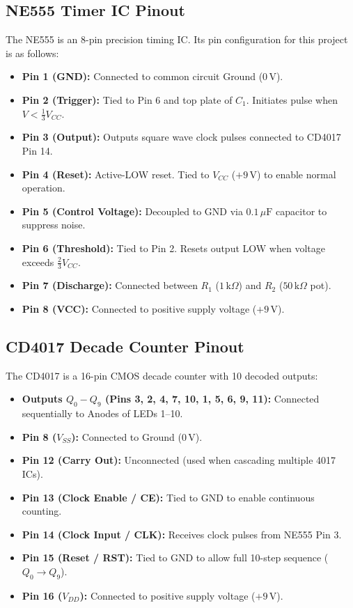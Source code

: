 \documentclass[11pt,a4paper]{article}
\begin{document}
\subsection{NE555 Timer IC Pinout}
The NE555 is an 8-pin precision timing IC. Its pin configuration for this project is as follows:
\begin{itemize}[noitemsep]
    \item \textbf{Pin 1 (GND):} Connected to common circuit Ground ($0\,\text{V}$).
    \item \textbf{Pin 2 (Trigger):} Tied to Pin 6 and top plate of $C_1$. Initiates pulse when $V < \frac{1}{3}V_{CC}$.
    \item \textbf{Pin 3 (Output):} Outputs square wave clock pulses connected to CD4017 Pin 14.
    \item \textbf{Pin 4 (Reset):} Active-LOW reset. Tied to $V_{CC}$ ($+9\,\text{V}$) to enable normal operation.
    \item \textbf{Pin 5 (Control Voltage):} Decoupled to GND via $0.1\,\mu\text{F}$ capacitor to suppress noise.
    \item \textbf{Pin 6 (Threshold):} Tied to Pin 2. Resets output LOW when voltage exceeds $\frac{2}{3}V_{CC}$.
    \item \textbf{Pin 7 (Discharge):} Connected between $R_1$ ($1\,\text{k}\Omega$) and $R_2$ ($50\,\text{k}\Omega$ pot).
    \item \textbf{Pin 8 (VCC):} Connected to positive supply voltage ($+9\,\text{V}$).
\end{itemize}

\subsection{CD4017 Decade Counter Pinout}
The CD4017 is a 16-pin CMOS decade counter with 10 decoded outputs:
\begin{itemize}[noitemsep]
    \item \textbf{Outputs $Q_0 - Q_9$ (Pins 3, 2, 4, 7, 10, 1, 5, 6, 9, 11):} Connected sequentially to Anodes of LEDs 1--10.
    \item \textbf{Pin 8 ($V_{SS}$):} Connected to Ground ($0\,\text{V}$).
    \item \textbf{Pin 12 (Carry Out):} Unconnected (used when cascading multiple 4017 ICs).
    \item \textbf{Pin 13 (Clock Enable / CE):} Tied to GND to enable continuous counting.
    \item \textbf{Pin 14 (Clock Input / CLK):} Receives clock pulses from NE555 Pin 3.
    \item \textbf{Pin 15 (Reset / RST):} Tied to GND to allow full 10-step sequence ($Q_0 \rightarrow Q_9$).
    \item \textbf{Pin 16 ($V_{DD}$):} Connected to positive supply voltage ($+9\,\text{V}$).
\end{itemize}
\end{document}
